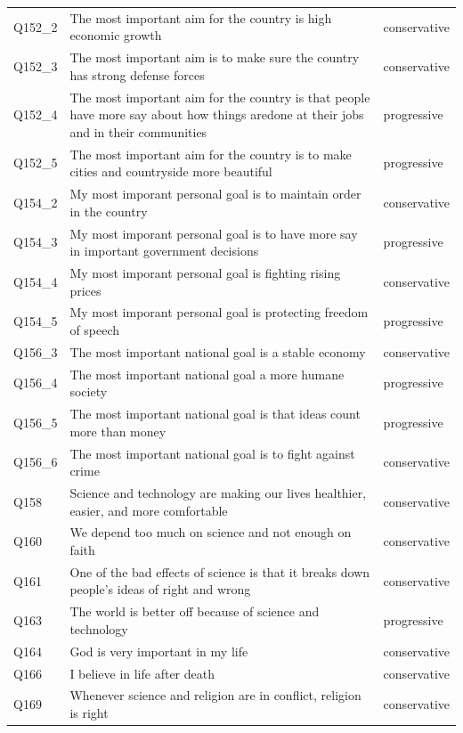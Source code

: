 \documentclass[]{ceurart}
\begin{document}
\begin{longtable}{@{\extracolsep{\fill}}l>{\raggedright\arraybackslash}p{}l}
Q152\_2 & The most important aim for the country is high economic growth & conservative \\ 
Q152\_3 & The most important aim is to make sure the country has strong defense forces & conservative \\ 
Q152\_4 & The most important aim for the country is that people have more say about how things are\newline done at their jobs and in their communities & progressive \\ 
Q152\_5 & The most important aim for the country is to make cities and countryside more beautiful & progressive \\ 
Q154\_2 & My most imporant personal goal is to maintain order in the country & conservative \\ 
Q154\_3 & My most imporant personal goal is to have more say in important government decisions & progressive \\ 
Q154\_4 & My most imporant personal goal is fighting rising prices & conservative \\ 
Q154\_5 & My most imporant personal goal is protecting freedom of speech & progressive \\ 
Q156\_3 & The most important national goal is a stable economy & conservative \\ 
Q156\_4 & The most important national goal a more humane society & progressive \\ 
Q156\_5 & The most important national goal is that ideas count more than money & progressive \\ 
Q156\_6 & The most important national goal is to fight against crime & conservative \\ 
Q158 & Science and technology are making our lives healthier, easier, and more comfortable & conservative \\ 
Q160 & We depend too much on science and not enough on faith & conservative \\ 
Q161 & One of the bad effects of science is that it breaks down people’s ideas of right and wrong & conservative \\ 
Q163 & The world is better off because of science and technology & progressive \\ 
Q164 & God is very important in my life & conservative \\ 
Q166 & I believe in life after death & conservative \\ 
Q169 & Whenever science and religion are in conflict, religion is right & conservative \\ 

\end{longtable}
\end{document}

